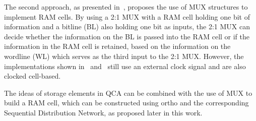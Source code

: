 The second approach, as presented in~\cite{ahmad2018optimal, majeed2019optimal}, proposes the use of MUX structures to implement RAM cells. By using a 2:1 MUX with a RAM cell holding one bit of information and a bitline (BL) also holding one bit as inputs, the 2:1 MUX can decide whether the information on the BL is passed into the RAM cell or if the information in the RAM cell is retained, based on the information on the wordline (WL) which serves as the third input to the 2:1 MUX. However, the implementations shown in~\cite{ahmad2018optimal} and~\cite{majeed2019optimal} still use an external clock signal and are also clocked cell-based.

The ideas of storage elements in QCA can be combined with the use of MUX to build a RAM cell, which can be constructed using ortho and the corresponding Sequential Distribution Network, as proposed later in this work.
